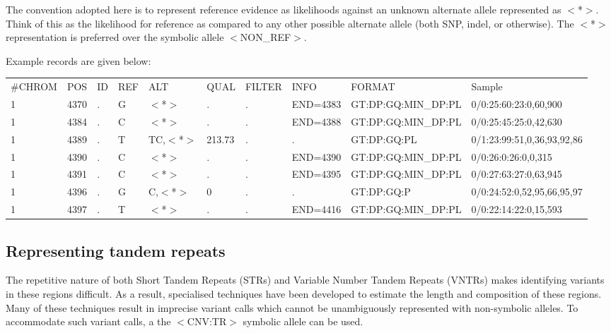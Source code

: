 \documentclass[8pt]{article}
\begin{document}
The convention adopted here is to represent reference evidence as likelihoods against an unknown alternate allele represented as $<$*$>$.
Think of this as the likelihood for reference as compared to any other possible alternate allele (both SNP, indel, or otherwise).
The $<$*$>$ representation is preferred over the symbolic allele $<$NON\_REF$>$.

Example records are given below:
\scriptsize
\begin{flushleft}
\begin{tabular}{ l l l l l l l l l l }
\#CHROM & POS & ID & REF & ALT & QUAL & FILTER & INFO & FORMAT & Sample \\
1 & 4370 & . & G & $<$*$>$ & . & . & END=4383 & GT:DP:GQ:MIN\_DP:PL & 0/0:25:60:23:0,60,900 \\
1 & 4384 & . & C & $<$*$>$ & . & . & END=4388 & GT:DP:GQ:MIN\_DP:PL & 0/0:25:45:25:0,42,630 \\
1 & 4389 & . & T & TC,$<$*$>$ & 213.73 & . & . & GT:DP:GQ:PL & 0/1:23:99:51,0,36,93,92,86 \\
1 & 4390 & . & C & $<$*$>$ & . & . & END=4390 & GT:DP:GQ:MIN\_DP:PL & 0/0:26:0:26:0,0,315 \\
1 & 4391 & . & C & $<$*$>$ & . & . & END=4395 & GT:DP:GQ:MIN\_DP:PL & 0/0:27:63:27:0,63,945 \\
1 & 4396 & . & G & C,$<$*$>$ & 0 & . & . & GT:DP:GQ:P & 0/0:24:52:0,52,95,66,95,97 \\
1 & 4397 & . & T & $<$*$>$ & . & . & END=4416 & GT:DP:GQ:MIN\_DP:PL & 0/0:22:14:22:0,15,593 \\
\end{tabular}
\end{flushleft}
\normalsize

\pagebreak
\subsection{Representing tandem repeats}
\label{tandem-repeats}

The repetitive nature of both Short Tandem Repeats (STRs) and Variable Number Tandem Repeats (VNTRs) makes identifying variants in these regions difficult.
As a result, specialised techniques have been developed to estimate the length and composition of these regions.
Many of these techniques result in imprecise variant calls which cannot be unambiguously represented with non-symbolic alleles.
To accommodate such variant calls, a the $<$CNV:TR$>$ symbolic allele can be used.
\end{document}
